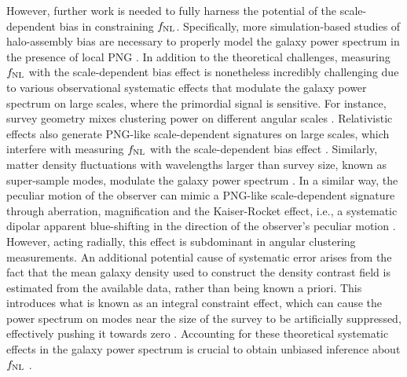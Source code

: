  However, further work is needed to fully harness the potential of the scale-dependent bias in constraining $f_{\rm NL}$. Specifically, more simulation-based studies of halo-assembly bias are necessary to properly model the galaxy power spectrum in the presence of local PNG \citep{2020JCAP...12..013B, 2020JCAP...12..031B, 2022JCAP...11..013B, 2023JCAP...01..023L}. In addition to the theoretical challenges, measuring $f_{\rm NL}$ with the scale-dependent bias effect is nonetheless incredibly challenging due to various observational systematic effects that modulate the galaxy power spectrum on large scales, where the primordial signal is sensitive. For instance, survey geometry mixes clustering power on different angular scales \citep{beutler2014clustering,wilson2017rapid}. Relativistic effects also generate PNG-like scale-dependent signatures on large scales, which interfere with measuring $f_{\rm NL}$ with the scale-dependent bias effect \citep{wang2020}. Similarly, matter density fluctuations with wavelengths larger than survey size, known as super-sample modes, modulate the galaxy power spectrum \citep{castorina2020JCAP}. In a similar way, the peculiar motion of the observer can mimic a PNG-like scale-dependent signature through aberration, magnification and the Kaiser-Rocket effect, i.e., a systematic dipolar apparent blue-shifting in the direction of the observer's peculiar motion \citep{2021JCAP...11..027B}. However, acting radially, this effect is subdominant in angular clustering measurements. An additional potential cause of systematic error arises from the fact that the mean galaxy density used to construct the density contrast field is estimated from the available data, rather than being known a priori. This introduces what is known as an integral constraint effect, which can cause the power spectrum on modes near the size of the survey to be artificially suppressed, effectively pushing it towards zero \citep{peacock1991large,de2019integral}. Accounting for these theoretical systematic effects in the galaxy power spectrum is crucial to obtain unbiased inference about $f_{\rm NL}$ \citep[see, e.g.,][]{riquelme2022primordial}. 

